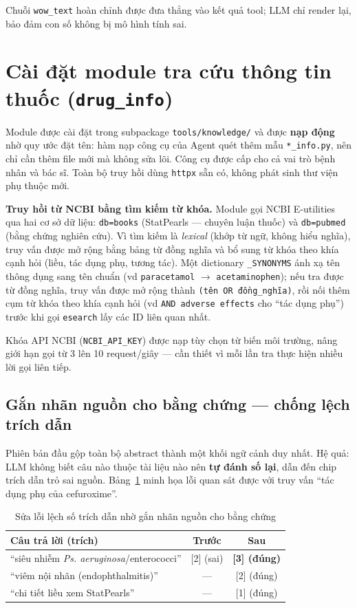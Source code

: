 \documentclass[a4paper,13pt,3p,oneside]{report}
\theoremstyle{definition}
\theoremstyle{remark}
\theoremstyle{definition}
\begin{document}
Chuỗi \texttt{wow\_text} hoàn chỉnh được đưa thẳng vào kết quả tool; LLM chỉ render lại, bảo đảm con số không bị mô hình tính sai.

\section{Cài đặt module tra cứu thông tin thuốc (\texttt{drug\_info})}

Module được cài đặt trong subpackage \texttt{tools/knowledge/} và được \textbf{nạp động} nhờ quy ước đặt tên: hàm nạp công cụ của Agent quét thêm mẫu \texttt{*\_info.py}, nên chỉ cần thêm file mới mà không sửa lõi. Công cụ được cấp cho cả vai trò bệnh nhân và bác sĩ. Toàn bộ truy hồi dùng \texttt{httpx} sẵn có, không phát sinh thư viện phụ thuộc mới.

\textbf{Truy hồi từ NCBI bằng tìm kiếm từ khóa.} Module gọi NCBI E-utilities qua hai cơ sở dữ liệu: \texttt{db=books} (StatPearls --- chuyên luận thuốc) và \texttt{db=pubmed} (bằng chứng nghiên cứu). Vì tìm kiếm là \textit{lexical} (khớp từ ngữ, không hiểu nghĩa), truy vấn được mở rộng bằng bảng từ đồng nghĩa và bổ sung từ khóa theo khía cạnh hỏi (liều, tác dụng phụ, tương tác). Một dictionary \texttt{\_SYNONYMS} ánh xạ tên thông dụng sang tên chuẩn (vd \texttt{paracetamol} $\to$ \texttt{acetaminophen}); nếu tra được từ đồng nghĩa, truy vấn được mở rộng thành \texttt{(tên OR đồng\_nghĩa)}, rồi nối thêm cụm từ khóa theo khía cạnh hỏi (vd \texttt{AND adverse effects} cho ``tác dụng phụ'') trước khi gọi \texttt{esearch} lấy các ID liên quan nhất.

Khóa API NCBI (\texttt{NCBI\_API\_KEY}) được nạp tùy chọn từ biến môi trường, nâng giới hạn gọi từ 3 lên 10 request/giây --- cần thiết vì mỗi lần tra thực hiện nhiều lời gọi liên tiếp.

\subsection{Gắn nhãn nguồn cho bằng chứng --- chống lệch trích dẫn}

Phiên bản đầu gộp toàn bộ abstract thành một khối ngữ cảnh duy nhất. Hệ quả: LLM không biết câu nào thuộc tài liệu nào nên \textbf{tự đánh số lại}, dẫn đến chip trích dẫn trỏ sai nguồn. Bảng~\ref{tab:cite-fix} minh họa lỗi quan sát được với truy vấn ``tác dụng phụ của cefuroxime''.

\begin{table}[H]
\centering
\begin{tabular}{|p{6.2cm}|c|c|}
\hline
\textbf{Câu trả lời (trích)} & \textbf{Trước} & \textbf{Sau} \\
\hline
``siêu nhiễm \textit{Ps. aeruginosa}/enterococci'' & [2] (sai) & \textbf{[3] (đúng)} \\
\hline
``viêm nội nhãn (endophthalmitis)'' & --- & [2] (đúng) \\
\hline
``chi tiết liều xem StatPearls'' & --- & [1] (đúng) \\
\hline
\end{tabular}
\caption{Sửa lỗi lệch số trích dẫn nhờ gắn nhãn nguồn cho bằng chứng}
\label{tab:cite-fix}
\end{table}
\end{document}
